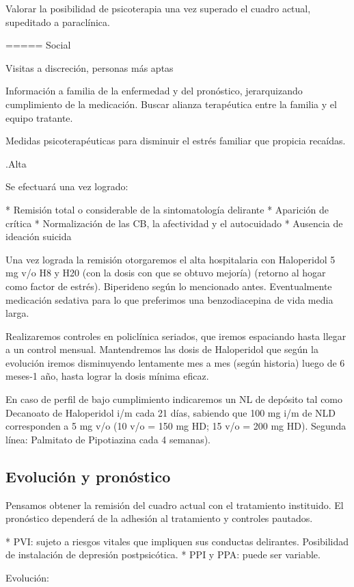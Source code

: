 Valorar la posibilidad de psicoterapia una vez superado el cuadro actual, supeditado a paraclínica.

===== Social

Visitas a discreción, personas más aptas

Información a familia de la enfermedad y del pronóstico, jerarquizando cumplimiento de la medicación. Buscar alianza terapéutica entre la familia y el equipo tratante.

Medidas psicoterapéuticas para disminuir el estrés familiar que propicia recaídas.

.Alta

Se efectuará una vez logrado:

* Remisión total o considerable de la sintomatología delirante
* Aparición de crítica
* Normalización de las CB, la afectividad y el autocuidado
* Ausencia de ideación suicida


Una vez lograda la remisión otorgaremos el alta hospitalaria con Haloperidol 5 mg v/o H8 y H20 (con la dosis con que se obtuvo mejoría) (retorno al hogar como factor de estrés). Biperideno según lo mencionado antes. Eventualmente medicación sedativa para lo que preferimos una benzodiacepina de vida media larga.

Realizaremos controles en policlínica seriados, que iremos espaciando hasta llegar a un control mensual. Mantendremos las dosis de Haloperidol que según la evolución iremos disminuyendo lentamente mes a mes (según historia) luego de 6 meses-1 año, hasta lograr la dosis mínima eficaz.

En caso de perfil de bajo cumplimiento indicaremos un NL de depósito tal como Decanoato de Haloperidol i/m cada 21 días, sabiendo que 100 mg i/m de NLD corresponden a 5 mg v/o (10 v/o = 150 mg HD; 15 v/o = 200 mg HD). Segunda línea: Palmitato de Pipotiazina cada 4 semanas).

\subsection*{Evolución y pronóstico}

Pensamos obtener la remisión del cuadro actual con el tratamiento instituido. El pronóstico dependerá de la adhesión al tratamiento y controles pautados.

* PVI: sujeto a riesgos vitales que impliquen sus conductas delirantes. Posibilidad de instalación de depresión postpsicótica.
* PPI y PPA: puede ser variable.

Evolución:

